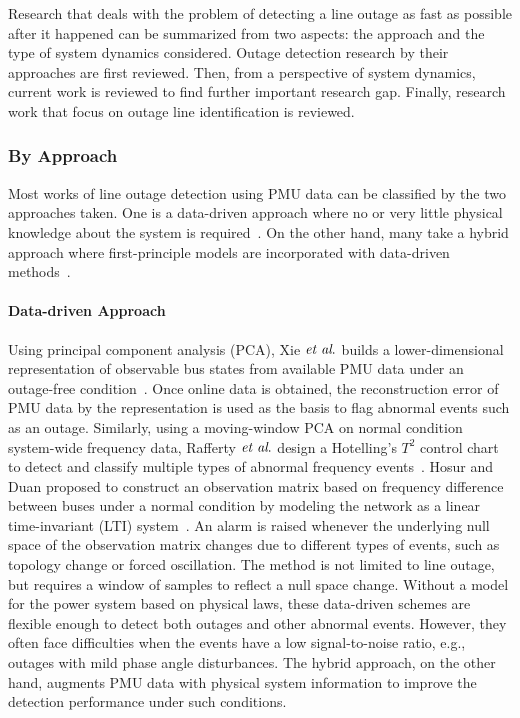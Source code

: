 Research that deals with the problem of detecting a line outage as fast as possible after it happened can be summarized from two aspects: the approach and the type of system dynamics considered. Outage detection research by their approaches are first reviewed. Then, from a perspective of system dynamics, current work is reviewed to find further important research gap. Finally, research work that focus on outage line identification is reviewed. 

\subsubsection{By Approach} %
\label{ssub:by_approach}

Most works of line outage detection using PMU data can be classified by the two approaches taken. One is a data-driven approach where no or very little physical knowledge about the system is required~\cite{Xie2014, Rafferty2016, Hosur2019}. On the other hand, many take a hybrid approach where first-principle models are incorporated with data-driven methods~\cite{Jamei2016, Jamei2017a, ardakanian2017event, Ardakanian2019a, Tate2008, tate2009double, dai2020line,Chen2016, Rovatsos2017}. 

\paragraph{Data-driven Approach}
Using principal component analysis (PCA), Xie $\textit{et al}.$ builds a lower-dimensional representation of observable bus states from available PMU data under an outage-free condition~\cite{Xie2014}. Once online data is obtained, the reconstruction error of PMU data by the representation is used as the basis to flag abnormal events such as an outage. 
Similarly, using a moving-window PCA on normal condition system-wide frequency data, Rafferty $\textit{et al}.$ design a Hotelling's $T^2$ control chart to detect and classify multiple types of abnormal frequency events~\cite{Rafferty2016}. 
Hosur and Duan proposed to construct an observation matrix based on frequency difference between buses under a normal condition by modeling the network as a linear time-invariant (LTI) system~\cite{Hosur2019}. An alarm is raised whenever the underlying null space of the observation matrix changes due to different types of events, such as topology change or forced oscillation. The method is not limited to line outage, but requires a window of samples to reflect a null space change.
Without a model for the power system based on physical laws, these data-driven schemes are flexible enough to detect both outages and other abnormal events. However, they often face difficulties when the events have a low signal-to-noise ratio, e.g., outages with mild phase angle disturbances. The hybrid approach, on the other hand, augments PMU data with physical system information to improve the detection performance under such conditions. 

